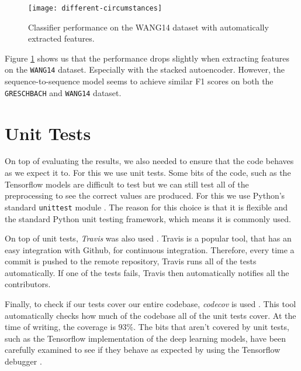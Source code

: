 \begin{figure}[ht]
  \centering
  \texttt{[image: different-circumstances]}
  \caption{Classifier performance on the WANG14 dataset with automatically extracted features.}
  \label{fig:different-circumstances}
\end{figure}

Figure \ref{fig:different-circumstances} shows us that the performance drops slightly when extracting features on the \texttt{WANG14} dataset.
Especially with the stacked autoencoder.
However, the sequence-to-sequence model seems to achieve similar F1 scores on both the \texttt{GRESCHBACH} and \texttt{WANG14} dataset.

\section{Unit Tests}

On top of evaluating the results, we also needed to ensure that the code behaves as we expect it to.
For this we use unit tests.
Some bits of the code, such as the Tensorflow models are difficult to test but we can still test all of the preprocessing to see the correct values are produced.
For this we use Python's standard \texttt{unittest} module \cite{python_unittest_documentation}.
The reason for this choice is that it is flexible and the standard Python unit testing framework, which means it is commonly used.

On top of unit tests, \textit{Travis} was also used \cite{travis}.
Travis is a popular tool, that has an easy integration with Github, for continuous integration.
Therefore, every time a commit is pushed to the remote repository, Travis runs all of the tests automatically.
If one of the tests fails, Travis then automatically notifies all the contributors.

Finally, to check if our tests cover our entire codebase, \textit{codecov} is used \cite{codecov}.
This tool automatically checks how much of the codebase all of the unit tests cover.
At the time of writing, the coverage is $93\%$.
The bits that aren't covered by unit tests, such as the Tensorflow implementation of the deep learning models, have been carefully examined to see if they behave as expected by using the Tensorflow debugger \cite{tensorflow}.
